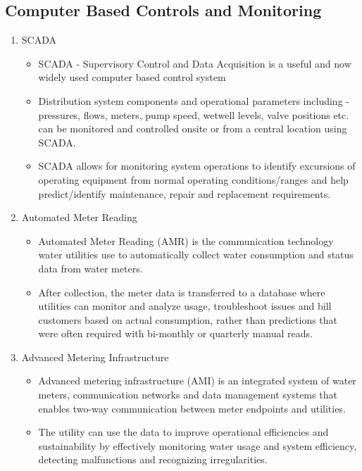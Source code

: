 \subsection{Computer Based Controls and Monitoring} 
\begin{enumerate}
\item SCADA 
\begin{itemize}
\item SCADA - Supervisory Control and Data Acquisition is a  useful and now widely used  computer based control system
\item Distribution system components and operational parameters including - pressures, flows, meters, pump speed, wetwell levels, valve positions etc. can be monitored and controlled onsite or from a central location using SCADA.
\item SCADA allows for monitoring system operations to identify excursions of operating equipment from normal operating conditions/ranges and help predict/identify maintenance, repair and replacement requirements.
\end{itemize}
\item Automated Meter Reading 
\begin{itemize}
\item  Automated Meter Reading (AMR) is the communication technology water utilities use to automatically collect water consumption and status data from water meters. 
\item After collection, the meter data is transferred to a database where utilities can monitor and analyze usage, troubleshoot issues and bill customers based on actual consumption, rather than predictions that were often required with bi-monthly or quarterly manual reads.
\end{itemize}
\item Advanced Metering Infrastructure 
\begin{itemize}
\item Advanced metering infrastructure (AMI) is an integrated system of water meters, communication networks and data management systems that enables two-way communication between meter endpoints and utilities.  
\item The utility can use the data to improve operational efficiencies and sustainability by effectively monitoring water usage and system efficiency, detecting malfunctions and recognizing irregularities.
\end{itemize}
\end{enumerate}

